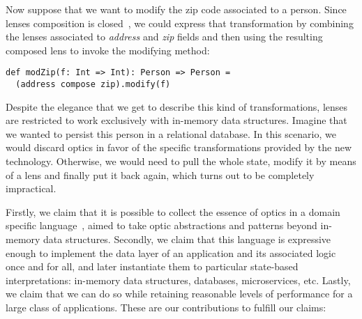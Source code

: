 \documentclass[preview, 3p]{elsarticle}
\begin{document}
Now suppose that we want to modify the zip code associated to a person. Since
lenses composition is closed~\cite{pickering2017profunctor}, we could express
that transformation by combining the lenses associated to \emph{address} and
\emph{zip} fields and then using the resulting composed lens to invoke the
modifying method:

\begin{lstlisting}
def modZip(f: Int => Int): Person => Person =
  (address compose zip).modify(f)
\end{lstlisting}

Despite the elegance that we get to describe this kind of transformations,
lenses are restricted to work exclusively with in-memory data structures.
Imagine that we wanted to persist this person in a relational database. In this
scenario, we would discard optics in favor of the specific transformations
provided by the new technology. Otherwise, we would need to pull the whole
state, modify it by means of a lens and finally put it back again, which turns
out to be completely impractical.

Firstly, we claim that it is possible to collect the essence of optics in a
domain specific language~\cite{hudak1996building}, aimed to take optic
abstractions and patterns beyond in-memory data structures. Secondly, we claim
that this language is expressive enough to implement the data layer of an
application and its associated logic once and for all, and later instantiate
them to particular state-based interpretations: in-memory data structures,
databases, microservices, etc. Lastly, we claim that we can do so while
retaining reasonable levels of performance for a large class of applications.
These are our contributions to fulfill our claims:
\end{document}
